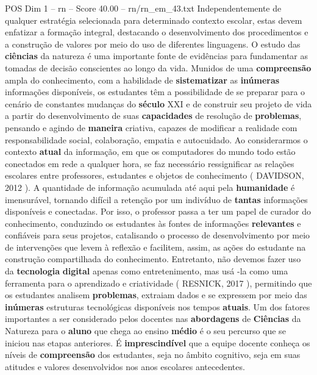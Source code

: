 \begin{textsample}{POS Dim 1 – rn – Score 40.00 – rn/rn\_em\_43.txt}  \label{ex:f1_pos_267}
Independentemente de qualquer estratégia selecionada para determinado contexto escolar, estas devem enfatizar a formação integral, destacando o desenvolvimento dos procedimentos e a construção de valores por meio do uso de diferentes linguagens.
O estudo das \textbf{ciências} da natureza é uma importante fonte de evidências para fundamentar as tomadas de decisão conscientes ao longo da vida.
Munidos de uma \textbf{compreensão} ampla do conhecimento, com a habilidade de \textbf{sistematizar} as \textbf{inúmeras} informações disponíveis, os estudantes têm a possibilidade de se preparar para o cenário de constantes mudanças do \textbf{século} XXI e de construir seu projeto de vida a partir do desenvolvimento de suas \textbf{capacidades} de resolução de \textbf{problemas}, pensando e agindo de \textbf{maneira} criativa, capazes de modificar a realidade com responsabilidade social, colaboração, empatia e autocuidado.
Ao considerarmos o contexto \textbf{atual} da informação, em que os computadores do mundo todo estão conectados em rede a qualquer hora, se faz necessário ressignificar as relações escolares entre professores, estudantes e objetos de conhecimento ( DAVIDSON, 2012 ).
A quantidade de informação acumulada até aqui pela \textbf{humanidade} é imensurável, tornando difícil a retenção por um indivíduo de \textbf{tantas} informações disponíveis e conectadas.
Por isso, o professor passa a ter um papel de curador do conhecimento, conduzindo os estudantes às fontes de informações \textbf{relevantes} e confiáveis para seus projetos, catalisando o processo de desenvolvimento por meio de intervenções que levem à reflexão e facilitem, assim, as ações do estudante na construção compartilhada do conhecimento.
Entretanto, não devemos fazer uso da \textbf{tecnologia} \textbf{digital} apenas como entretenimento, mas usá -la como uma ferramenta para o aprendizado e criatividade ( RESNICK, 2017 ), permitindo que os estudantes analisem \textbf{problemas}, extraiam dados e se expressem por meio das \textbf{inúmeras} estruturas tecnológicas disponíveis nos tempos \textbf{atuais}.
Um dos fatores importantes a ser considerado pelos docentes nas \textbf{abordagens} de \textbf{Ciências} da Natureza para o \textbf{aluno} que chega ao ensino \textbf{médio} é o seu percurso que se iniciou nas etapas anteriores.
É \textbf{imprescindível} que a equipe docente conheça os níveis de \textbf{compreensão} dos estudantes, seja no âmbito cognitivo, seja em suas atitudes e valores desenvolvidos nos anos escolares antecedentes.

\end{textsample}
